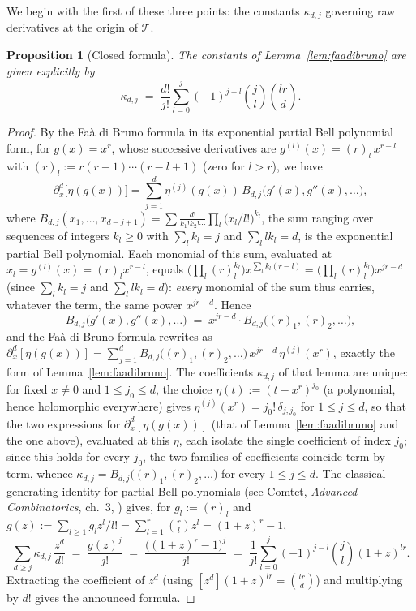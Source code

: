 \documentclass[11pt]{article}
\newtheorem{proposition}[theorem]{Proposition}
\theoremstyle{remark}
\begin{document}
We begin with the first of these three points: the constants $\kappa_{d,j}$ governing raw derivatives at the origin of $\mathcal T$.

\begin{proposition}[Closed formula]\label{prop:kappa-closed}
The constants of Lemma~\ref{lem:faadibruno} are given explicitly by
\[
\kappa_{d,j} \;=\; \frac{d!}{j!}\sum_{l=0}^{j}(-1)^{j-l}\binom{j}{l}\binom{lr}{d}.
\]
\end{proposition}

\begin{proof}
By the Faà di Bruno formula in its exponential partial Bell polynomial form, for $g(x)=x^r$, whose successive derivatives are $g^{(l)}(x)=(r)_l\,x^{r-l}$ with $(r)_l:=r(r-1)\cdots(r-l+1)$ (zero for $l>r$), we have
\[
\partial_x^d\big[\eta(g(x))\big] = \sum_{j=1}^d \eta^{(j)}(g(x))\,B_{d,j}\big(g'(x),g''(x),\dots\big),
\]
where $B_{d,j}(x_1,\dots,x_{d-j+1})=\sum \frac{d!}{k_1!k_2!\cdots}\prod_l\big(x_l/l!\big)^{k_l}$, the sum ranging over sequences of integers $k_l\ge0$ with $\sum_lk_l=j$ and $\sum_llk_l=d$, is the exponential partial Bell polynomial. Each monomial of this sum, evaluated at $x_l=g^{(l)}(x)=(r)_lx^{r-l}$, equals $\big(\prod_l(r)_l^{k_l}\big)x^{\sum_lk_l(r-l)}=\big(\prod_l(r)_l^{k_l}\big)x^{jr-d}$ (since $\sum_lk_l=j$ and $\sum_llk_l=d$): \emph{every} monomial of the sum thus carries, whatever the term, the same power $x^{jr-d}$. Hence
\[
B_{d,j}\big(g'(x),g''(x),\dots\big) \;=\; x^{jr-d}\cdot B_{d,j}\big((r)_1,(r)_2,\dots\big),
\]
and the Faà di Bruno formula rewrites as $\partial_x^d[\eta(g(x))]=\sum_{j=1}^d B_{d,j}\big((r)_1,(r)_2,\dots\big)\,x^{jr-d}\,\eta^{(j)}(x^r)$, exactly the form of Lemma~\ref{lem:faadibruno}. The coefficients $\kappa_{d,j}$ of that lemma are unique: for fixed $x\ne0$ and $1\le j_0\le d$, the choice $\eta(t):=(t-x^r)^{j_0}$ (a polynomial, hence holomorphic everywhere) gives $\eta^{(j)}(x^r)=j_0!\,\delta_{j,j_0}$ for $1\le j\le d$, so that the two expressions for $\partial_x^d[\eta(g(x))]$ (that of Lemma~\ref{lem:faadibruno} and the one above), evaluated at this $\eta$, each isolate the single coefficient of index $j_0$; since this holds for every $j_0$, the two families of coefficients coincide term by term, whence $\kappa_{d,j}=B_{d,j}\big((r)_1,(r)_2,\dots\big)$ for every $1\le j\le d$. The classical generating identity for partial Bell polynomials (see Comtet, \emph{Advanced Combinatorics}, ch.~3, \cite{Comtet}) gives, for $g_l:=(r)_l$ and $g(z):=\sum_{l\ge1}g_l z^l/l! = \sum_{l=1}^r\binom{r}{l}z^l = (1+z)^r-1$,
\[
\sum_{d\ge j}\kappa_{d,j}\,\frac{z^d}{d!} \;=\; \frac{g(z)^j}{j!} \;=\; \frac{\big((1+z)^r-1\big)^j}{j!} \;=\; \frac{1}{j!}\sum_{l=0}^j(-1)^{j-l}\binom{j}{l}(1+z)^{lr}.
\]
Extracting the coefficient of $z^d$ (using $[z^d](1+z)^{lr}=\binom{lr}{d}$) and multiplying by $d!$ gives the announced formula.
\end{proof}
\end{document}

